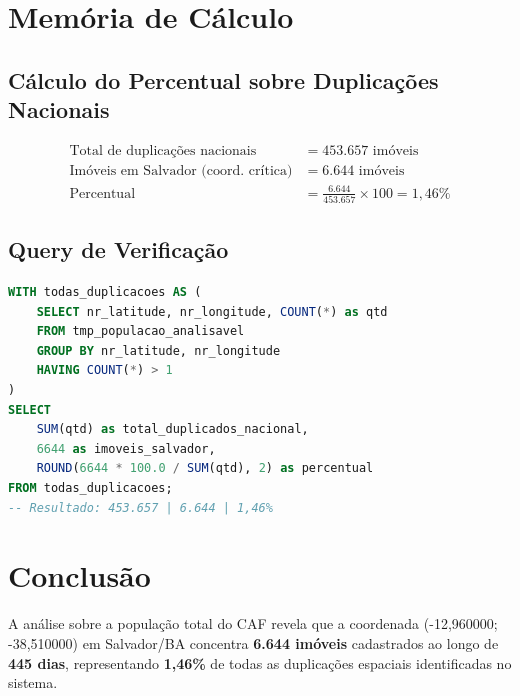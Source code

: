 \documentclass[11pt,a4paper]{article}
\begin{document}
\section{Memória de Cálculo}

\subsection{Cálculo do Percentual sobre Duplicações Nacionais}

\begin{align*}
\text{Total de duplicações nacionais} &= 453.657 \text{ imóveis} \\
\text{Imóveis em Salvador (coord. crítica)} &= 6.644 \text{ imóveis} \\
\text{Percentual} &= \frac{6.644}{453.657} \times 100 = 1,46\%
\end{align*}

\subsection{Query de Verificação}

\begin{lstlisting}[language=SQL, caption={Cálculo do percentual sobre duplicações nacionais}]
WITH todas_duplicacoes AS (
    SELECT nr_latitude, nr_longitude, COUNT(*) as qtd
    FROM tmp_populacao_analisavel
    GROUP BY nr_latitude, nr_longitude
    HAVING COUNT(*) > 1
)
SELECT
    SUM(qtd) as total_duplicados_nacional,
    6644 as imoveis_salvador,
    ROUND(6644 * 100.0 / SUM(qtd), 2) as percentual
FROM todas_duplicacoes;
-- Resultado: 453.657 | 6.644 | 1,46%
\end{lstlisting}

\section{Conclusão}

A análise sobre a população total do CAF revela que a coordenada (-12,960000; -38,510000)
em Salvador/BA concentra \textbf{6.644 imóveis} cadastrados ao longo de \textbf{445 dias},
representando \textbf{1,46\%} de todas as duplicações espaciais identificadas no sistema.
\end{document}
